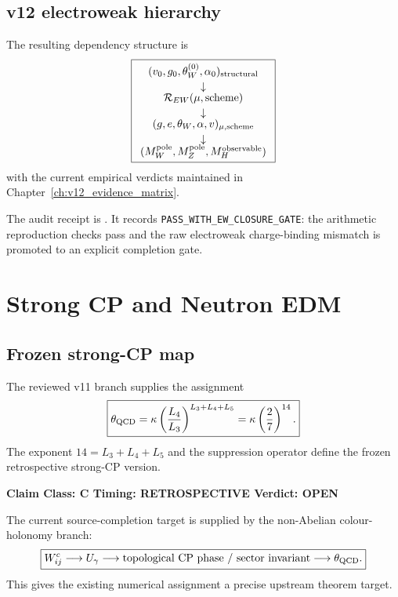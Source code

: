 \documentclass[11pt,a4paper,twoside]{book}
\theoremstyle{definition}
\newcommand{\vTwelveStatus}[3]{\par\noindent\textbf{Claim Class: #1 \quad Timing: #2 \quad Verdict: #3}\par}
\begin{document}
\section{v12 electroweak hierarchy}

The resulting dependency structure is
\[
\boxed{
\begin{array}{c}
(v_0,g_0,\theta_W^{(0)},\alpha_0)_{\rm structural}\\[2pt]
\downarrow\\[-2pt]
\mathcal R_{EW}(\mu,\mathrm{scheme})\\[2pt]
\downarrow\\[-2pt]
(g,e,\theta_W,\alpha,v)_{\mu,\mathrm{scheme}}\\[2pt]
\downarrow\\[-2pt]
(M_W^{\rm pole},M_Z^{\rm pole},M_H^{\rm observable})
\end{array}}
\]
with the current empirical verdicts maintained in Chapter~\ref{ch:v12_evidence_matrix}.

The audit receipt is
. It records \texttt{PASS\_WITH\_EW\_CLOSURE\_GATE}: the arithmetic reproduction checks pass and the raw electroweak charge-binding mismatch is promoted to an explicit completion gate.

\clearpage

\chapter{Strong CP and Neutron EDM}
\label{ch:v12_strong_cp_edm}

\section{Frozen strong-CP map}

The reviewed v11 branch supplies the assignment
\begin{equation}
\boxed{
\theta_{\rm QCD}
=\kappa\left(\frac{L_4}{L_3}\right)^{L_3+L_4+L_5}
=\kappa\left(\frac27\right)^{14}.
}
\label{eq:v12_theta_qcd}
\end{equation}
The exponent $14=L_3+L_4+L_5$ and the suppression operator define the frozen retrospective strong-CP version.
\vTwelveStatus{C}{RETROSPECTIVE}{OPEN}

The current source-completion target is supplied by the non-Abelian colour-holonomy branch:
\begin{equation}
\boxed{
W_{ij}^{c}
\longrightarrow
U_\gamma
\longrightarrow
\text{topological CP phase / sector invariant}
\longrightarrow
\theta_{\rm QCD}.
}
\label{eq:v12_strongcp_source_axis}
\end{equation}
This gives the existing numerical assignment a precise upstream theorem target.
\end{document}

